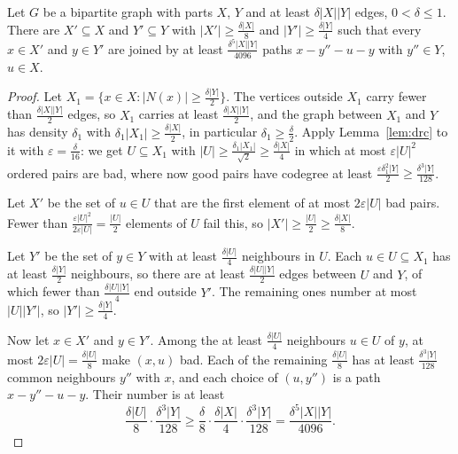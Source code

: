\begin{lemma}\label{lem:paths}
Let $G$ be a bipartite graph with parts $X$, $Y$ and at least $\delta|X||Y|$ edges, $0<\delta\le1$. There are $X'\subseteq X$ and $Y'\subseteq Y$ with $|X'|\ge\frac{\delta|X|}8$ and $|Y'|\ge\frac{\delta|Y|}4$ such that every $x\in X'$ and $y\in Y'$ are joined by at least $\frac{\delta^5|X||Y|}{4096}$ paths $x-y''-u-y$ with $y''\in Y$, $u\in X$.
\end{lemma}
\begin{proof}
Let $X_1=\{x\in X:|N(x)|\ge\frac{\delta|Y|}2\}$. The vertices outside $X_1$ carry fewer than $\frac{\delta|X||Y|}2$ edges, so $X_1$ carries at least $\frac{\delta|X||Y|}2$, and the graph between $X_1$ and $Y$ has density $\delta_1$ with $\delta_1|X_1|\ge\frac{\delta|X|}2$, in particular $\delta_1\ge\frac\delta2$. Apply Lemma~\ref{lem:drc} to it with $\varepsilon=\frac\delta{16}$: we get $U\subseteq X_1$ with $|U|\ge\frac{\delta_1|X_1|}{\sqrt2}\ge\frac{\delta|X|}4$ in which at most $\varepsilon|U|^2$ ordered pairs are bad, where now good pairs have codegree at least $\frac{\varepsilon\delta_1^2|Y|}2\ge\frac{\delta^3|Y|}{128}$.

Let $X'$ be the set of $u\in U$ that are the first element of at most $2\varepsilon|U|$ bad pairs. Fewer than $\frac{\varepsilon|U|^2}{2\varepsilon|U|}=\frac{|U|}2$ elements of $U$ fail this, so $|X'|\ge\frac{|U|}2\ge\frac{\delta|X|}8$.

Let $Y'$ be the set of $y\in Y$ with at least $\frac{\delta|U|}4$ neighbours in $U$. Each $u\in U\subseteq X_1$ has at least $\frac{\delta|Y|}2$ neighbours, so there are at least $\frac{\delta|U||Y|}2$ edges between $U$ and $Y$, of which fewer than $\frac{\delta|U||Y|}4$ end outside $Y'$. The remaining ones number at most $|U||Y'|$, so $|Y'|\ge\frac{\delta|Y|}4$.

Now let $x\in X'$ and $y\in Y'$. Among the at least $\frac{\delta|U|}4$ neighbours $u\in U$ of $y$, at most $2\varepsilon|U|=\frac{\delta|U|}8$ make $(x,u)$ bad. Each of the remaining $\frac{\delta|U|}8$ has at least $\frac{\delta^3|Y|}{128}$ common neighbours $y''$ with $x$, and each choice of $(u,y'')$ is a path $x-y''-u-y$. Their number is at least
\[
\frac{\delta|U|}8\cdot\frac{\delta^3|Y|}{128}\ge\frac\delta8\cdot\frac{\delta|X|}4\cdot\frac{\delta^3|Y|}{128}=\frac{\delta^5|X||Y|}{4096}.
\]
\end{proof}

